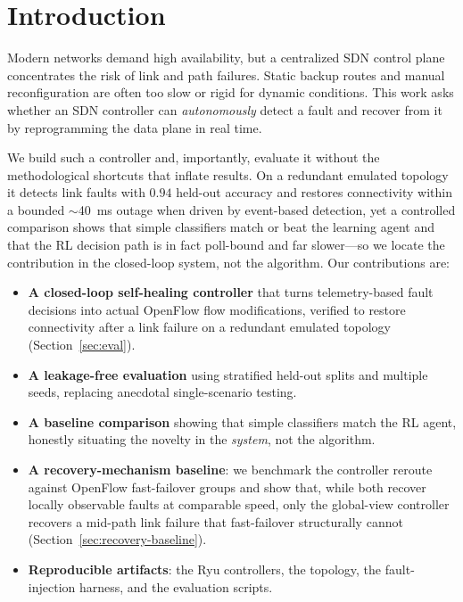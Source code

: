 \documentclass[conference]{IEEEtran}
\begin{document}
\section{Introduction}
Modern networks demand high availability, but a centralized SDN control plane
concentrates the risk of link and path failures. Static backup routes and manual
reconfiguration are often too slow or rigid for dynamic conditions. This work asks
whether an SDN controller can \emph{autonomously} detect a fault and recover from
it by reprogramming the data plane in real time.

We build such a controller and, importantly, evaluate it without the
methodological shortcuts that inflate results. On a redundant emulated topology it
detects link faults with $0.94$ held-out accuracy and restores connectivity within
a bounded $\sim$40~ms outage when driven by event-based detection, yet a controlled
comparison shows that simple classifiers match or beat the learning agent and that
the RL decision path is in fact poll-bound and far slower---so we locate the
contribution in the closed-loop system, not the algorithm. Our contributions are:
\begin{itemize}
  \item \textbf{A closed-loop self-healing controller} that turns telemetry-based
  fault decisions into actual OpenFlow flow modifications, verified to restore
  connectivity after a link failure on a redundant emulated topology
  (Section~\ref{sec:eval}).
  \item \textbf{A leakage-free evaluation} using stratified held-out splits and
  multiple seeds, replacing anecdotal single-scenario testing.
  \item \textbf{A baseline comparison} showing that simple classifiers match the
  RL agent, honestly situating the novelty in the \emph{system}, not the algorithm.
  \item \textbf{A recovery-mechanism baseline}: we benchmark the controller reroute
  against OpenFlow fast-failover groups and show that, while both recover
  locally observable faults at comparable speed, only the global-view controller
  recovers a mid-path link failure that fast-failover structurally cannot
  (Section~\ref{sec:recovery-baseline}).
  \item \textbf{Reproducible artifacts}: the Ryu controllers, the topology, the
  fault-injection harness, and the evaluation scripts.
\end{itemize}
\end{document}
